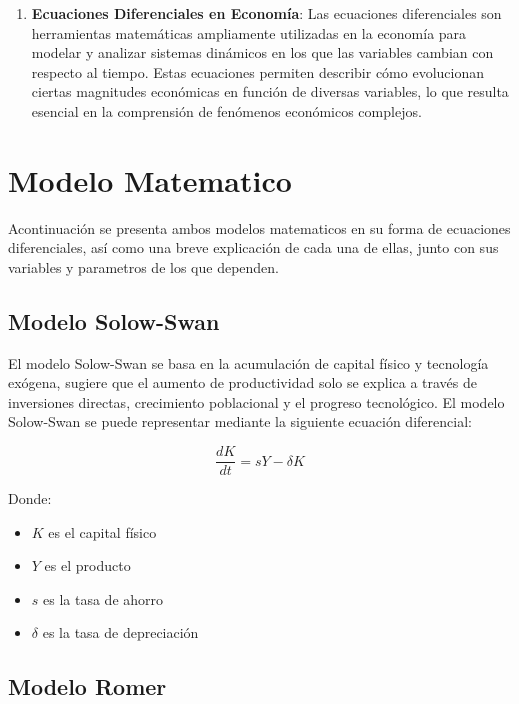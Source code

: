 \documentclass[letterpaper, 10pt]{article}
\begin{document}
\begin{enumerate}
\begin{itemize}
  \end{itemize}

  \item \textbf{Ecuaciones Diferenciales en Economía}: Las ecuaciones diferenciales son herramientas matemáticas ampliamente utilizadas en la economía para modelar y analizar sistemas dinámicos en los que las variables cambian con respecto al tiempo. Estas ecuaciones permiten describir cómo evolucionan ciertas magnitudes económicas en función de diversas variables, lo que resulta esencial en la comprensión de fenómenos económicos complejos.

\end{enumerate}

\section{Modelo Matematico}

Acontinuación se presenta ambos modelos matematicos en su forma de ecuaciones diferenciales, así como una breve explicación de cada una de ellas, junto con sus variables y parametros de los que dependen.

\subsection{Modelo Solow-Swan}

El modelo Solow-Swan se basa en la acumulación de capital físico y tecnología exógena, sugiere que el aumento de productividad solo se explica a través de inversiones directas, crecimiento poblacional y el progreso tecnológico.\cite{Chirwa18} El modelo Solow-Swan se puede representar mediante la siguiente ecuación diferencial:

\begin{equation}
  \frac{dK}{dt} = sY - \delta K
\end{equation}

Donde:

\begin{itemize}
  \item $K$ es el capital físico
  \item $Y$ es el producto
  \item $s$ es la tasa de ahorro
  \item $\delta$ es la tasa de depreciación
  
\end{itemize}

\subsection{Modelo Romer}
\end{document}
